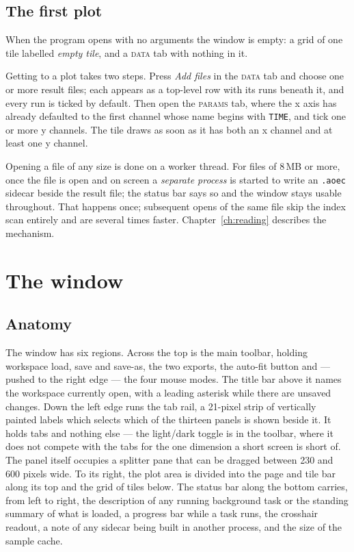 \documentclass[11pt,a4paper,oneside]{report}
\newcommand{\code}[1]{\texttt{#1}}
\newcommand{\tab}[1]{\textsc{#1}}
\begin{document}
\section{The first plot}

When the program opens with no arguments the window is empty: a grid of one tile
labelled \emph{empty tile}, and a \tab{data} tab with nothing in it.

Getting to a plot takes two steps. Press \emph{Add files} in the \tab{data} tab
and choose one or more result files; each appears as a top-level row with its
runs beneath it, and every run is ticked by default. Then open the \tab{params}
tab, where the x axis has already defaulted to the first channel whose name
begins with \code{TIME}, and tick one or more y channels. The tile draws as soon
as it has both an x channel and at least one y channel.

Opening a file of any size is done on a worker thread. For files of 8\,MB or
more, once the file is open and on screen a \emph{separate process} is started
to write an \code{.aoec} sidecar beside the result file; the status bar says so
and the window stays usable throughout. That happens once; subsequent opens of
the same file skip the index scan entirely and are several times faster.
Chapter~\ref{ch:reading} describes the mechanism.

\chapter{The window}

\section{Anatomy}

The window has six regions. Across the top is the main toolbar, holding
workspace load, save and save-as, the two exports, the auto-fit button and ---
pushed to the right edge --- the four mouse modes. The title bar above it names
the workspace currently open, with a leading asterisk while there are unsaved
changes. Down the left edge runs the tab rail, a 21-pixel strip of vertically
painted labels which selects which of the thirteen panels is shown beside it.
It holds tabs and nothing else --- the light/dark toggle is in the toolbar,
where it does not compete with the tabs for the one dimension a short screen is
short of. The
panel itself occupies a splitter pane that can be dragged between 230 and 600
pixels wide. To its right, the plot area is divided into the page and tile bar
along its top and the grid of tiles below. The status bar along the bottom
carries, from left to right, the description of any running background task or
the standing summary of what is loaded, a progress bar while a task runs, the
crosshair readout, a note of any sidecar being built in another process, and the
size of the sample cache.
\end{document}
